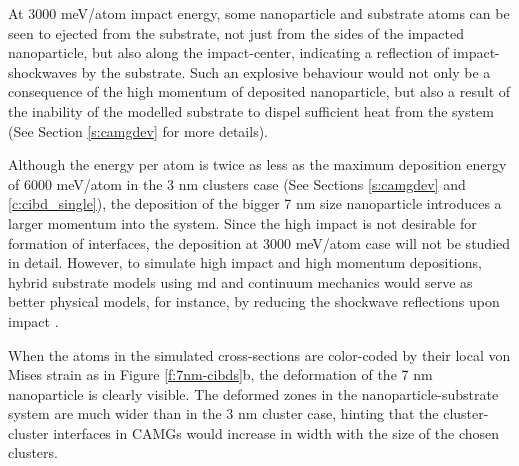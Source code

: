 At 3000 meV/atom impact energy, some nanoparticle and substrate atoms can be seen to ejected from the substrate, not just from the sides of the impacted nanoparticle, but also along the impact-center, indicating a reflection of impact-shockwaves by the substrate. Such an explosive behaviour would not only be a consequence of the high momentum of deposited nanoparticle, but also a result of the inability of the modelled substrate to dispel sufficient heat from the system (See Section \ref{s:camgdev} for more details). \par

Although the energy per atom is twice as less as the maximum deposition energy of 6000 meV/atom in the 3 nm clusters case (See Sections \ref{s:camgdev} and \ref{c:cibd_single}), the deposition of the bigger 7 nm size nanoparticle introduces a larger momentum into the system. Since the high impact is not desirable for formation of interfaces, the deposition at 3000 meV/atom case will not be studied in detail. However, to simulate high impact and high momentum depositions, hybrid substrate models using \gls{md} and continuum mechanics would serve as better physical models, for instance, by reducing the shockwave reflections upon impact \cite{Insepov1997,Allen2002}. \par

When the atoms in the simulated cross-sections are color-coded by their local von Mises strain as in Figure \ref{f:7nm-cibds}b, the deformation of the 7 nm nanoparticle is clearly visible. The deformed zones in the nanoparticle-substrate system are much wider than in the 3 nm cluster case, hinting that the cluster-cluster interfaces in CAMGs would increase in width with the size of the chosen clusters. \par

